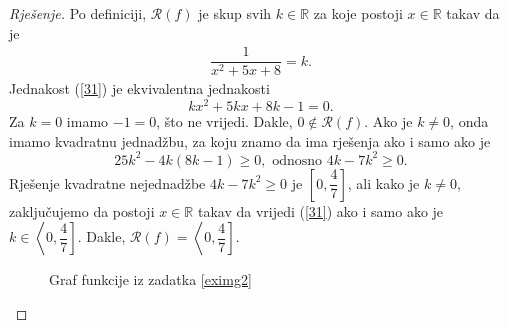 \begin{proof}[Rješenje]
Po definiciji, $\mathcal{R}(f)$ je skup svih $k\in \mathbb{R}$ za koje postoji $x\in \mathbb{R}$ takav da je
\begin{gather}
\label{31}
\dfrac{1}{x^2+5x+8}=k.
\end{gather}
Jednakost (\ref{31}) je ekvivalentna jednakosti
$$kx^2+5kx+8k-1=0.$$
Za $k=0$ imamo $-1=0$, što ne vrijedi. Dakle, $0\notin \mathcal{R}(f)$. Ako je $k\neq 0$, onda imamo kvadratnu jednadžbu, za koju znamo da ima rješenja ako i samo ako je
$$25k^2-4k(8k-1)\geq 0,\text{ odnosno } 4k-7k^2\geq 0.$$
Rješenje kvadratne nejednadžbe $4k-7k^2\geq 0$ je $\left[0, \dfrac{4}{7}\right]$, ali kako je $k\neq 0$, zaključujemo da postoji $x\in \mathbb{R}$ takav da vrijedi (\ref{31}) ako i samo ako je $k\in \left\langle 0, \dfrac{4}{7}\right]$. Dakle, $\mathcal{R}(f)=\left\langle 0, \dfrac{4}{7}\right]$.
\begin{figure}[ht]
\begin{center}
\end{center}
\caption{\label{exim2} Graf funkcije iz zadatka \ref{eximg2}}
\end{figure}
\end{proof}

